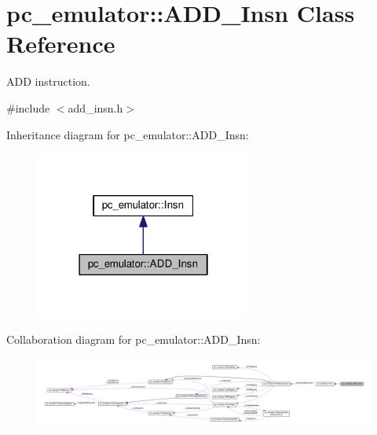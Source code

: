 \hypertarget{classpc__emulator_1_1ADD__Insn}{}\section{pc\+\_\+emulator\+:\+:A\+D\+D\+\_\+\+Insn Class Reference}
\label{classpc__emulator_1_1ADD__Insn}


A\+DD instruction.  




{\ttfamily \#include $<$add\+\_\+insn.\+h$>$}



Inheritance diagram for pc\+\_\+emulator\+:\+:A\+D\+D\+\_\+\+Insn\+:
\nopagebreak
\begin{figure}[H]
\begin{center}
\leavevmode
\includegraphics[width=202pt]{classpc__emulator_1_1ADD__Insn__inherit__graph}
\end{center}
\end{figure}


Collaboration diagram for pc\+\_\+emulator\+:\+:A\+D\+D\+\_\+\+Insn\+:
\nopagebreak
\begin{figure}[H]
\begin{center}
\leavevmode
\includegraphics[width=350pt]{classpc__emulator_1_1ADD__Insn__coll__graph}
\end{center}
\end{figure}
